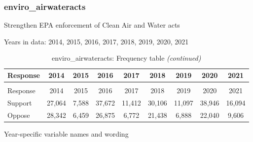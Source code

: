 \documentclass[
  12pt]{article}
\begin{document}
\hypertarget{enviro_airwateracts}{%
\subsubsection{enviro\_airwateracts}\label{enviro_airwateracts}}

Strengthen EPA enforcement of Clean Air and Water acts

Years in data: 2014, 2015, 2016, 2017, 2018, 2019, 2020,
2021\begingroup\fontsize{10}{12}\selectfont

\begin{longtable}[t]{lcccccccc}
\caption{\label{tab:unnamed-chunk-5}enviro\_airwateracts: Frequency table}\\
\toprule
Response & 2014 & 2015 & 2016 & 2017 & 2018 & 2019 & 2020 & 2021\\
\midrule
\endfirsthead
\caption[]{enviro\_airwateracts: Frequency table \textit{(continued)}}\\
\toprule
Response & 2014 & 2015 & 2016 & 2017 & 2018 & 2019 & 2020 & 2021\\
\midrule
\endhead

\endfoot
\bottomrule
\endlastfoot
Support & 27,064 & 7,588 & 37,672 & 11,412 & 30,106 & 11,097 & 38,946 & 16,094\\
Oppose & 28,342 & 6,459 & 26,875 & 6,772 & 21,438 & 6,888 & 22,040 & 9,606\\*
\end{longtable}
\endgroup{}

Year-specific variable names and
wording\begingroup\fontsize{11}{13}\selectfont
\end{document}
